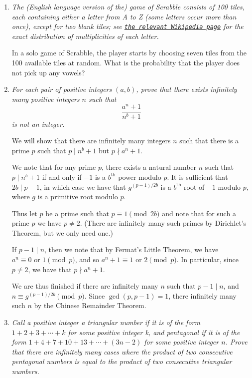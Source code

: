 \documentclass{article}
\begin{document}
\begin{enumerate}[1.]
\vspace{6pt}
\item %
{\itshape The (English language version of the) game of Scrabble\texttrademark{} consists of 100 tiles, each containing either a letter from A to Z (some letters occur more than once), except for two blank tiles; see \href{https://en.wikipedia.org/wiki/Scrabble_letter_distributions#English}{\texttt{the relevant Wikipedia page}} for the exact distribution of multiplicities of each letter.

In a solo game of Scrabble, the player starts by choosing seven tiles from the 100 available tiles at random. What is the probability that the player does not pick up any vowels?}


\vspace{6pt}
\item %
{\itshape For each pair of positive integers $(a, b)$, prove that there exists infinitely many positive integers $n$ such that
\[ \frac{a^n + 1}{n^b + 1} \]
is not an integer.}

We will show that there are infinitely many integers $n$ such that there is a prime $p$ such that $p \mid n^b + 1$ but $p \nmid a^n + 1$.

We note that for any prime $p$, there exists a natural number $n$ such that $p \mid n^b + 1$ if and only if $-1$ is a $b^\text{th}$ power modulo $p$. It is sufficient that $2b \mid p - 1$, in which case we have that $g^{(p - 1)/2b}$ is a $b^\text{th}$ root of $-1$ modulo $p$, where $g$ is a primitive root modulo $p$.

Thus let $p$ be a prime such that $p \equiv 1 \pmod{2b}$ and note that for such a prime $p$ we have $p \neq 2$. (There are infinitely many such primes by Dirichlet's Theorem, but we only need one.)

If $p - 1 \mid n$, then we note that by Fermat's Little Theorem, we have $a^n \equiv 0 \text{ or } 1 \pmod p$, and so $a^n + 1 \equiv 1 \text{ or } 2 \pmod p$. In particular, since $p \neq 2$, we have that $p \nmid a^n + 1$. 

We are thus finished if there are infinitely many $n$ such that $p - 1 \mid n$, and $n \equiv g^{(p - 1)/2b} \pmod p$. Since $\gcd(p, p - 1) = 1$, there infinitely many such $n$ by the Chinese Remainder Theorem.

\vspace{6pt}
\item %
{\itshape Call a positive integer a \emph{triangular} number if it is of the form $1 +2 +3 +\dotsb +k$ for some positive integer k, and \emph{pentagonal} if it is of the form $1 +4 +7 +10 +13 +\dotsb +(3n-2)$ for some positive integer $n$. Prove that there are infinitely many cases where the product of two consecutive pentagonal numbers is equal to the product of two consecutive triangular numbers.}


\end{enumerate}
\end{document}
